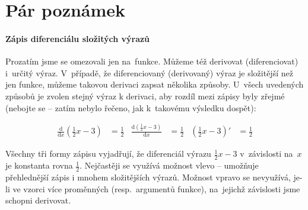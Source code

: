 \vfill{}
\pagebreak
\section{Pár poznámek}

\paragraph{Zápis diferenciálu složitých výrazů} Prozatím jsme se omezovali jen na~funkce. Můžeme též derivovat (diferenciovat) i~určitý výraz. V~případě, že diferenciovaný (derivovaný) výraz je složitější než jen funkce, můžeme takovou derivaci zapsat několika způsoby. U~všech uvedených způsobů je zvolen stejný výraz k derivaci, aby rozdíl mezi zápisy byly zřejmé (nebojte se -- zatím nebylo řečeno, jak k~takovému výsledku dospět):

\begin{align*}
    \frac{\text{d}}{\text{d}x} \left( \frac12 x - 3 \right) &= \frac12 &
    \frac{\text{d} \left( \frac12 x - 3 \right)}{\text{d}x} &= \frac12 &
    \left( \frac12 x - 3 \right)' &= \frac12
\end{align*}

Všechny tři formy zápisu vyjadřují, že diferenciál výrazu $\frac12 x - 3$ v~závislosti na~$x$ je konstanta rovna $\frac12$. Nejčastěji se využívá možnost vlevo -- umožňuje přehlednější zápis i mnohem složitějších výrazů. Možnost vpravo se nevyužívá, je-li ve vzorci více proměnných (resp.\ argumentů funkce), na~jejichž závislosti jsme schopni derivovat.
